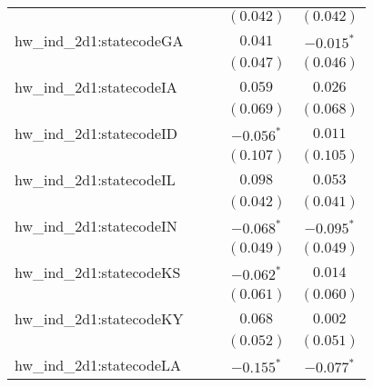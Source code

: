 \begin{center}
\begin{longtable}{l c c c c}
                         &                       &                       & $(0.042)$             & $(0.042)$             \\
hw\_ind\_2d1:statecodeGA &                       &                       & $0.041$               & $\mathbf{-0.015}^{*}$ \\
                         &                       &                       & $(0.047)$             & $(0.046)$             \\
hw\_ind\_2d1:statecodeIA &                       &                       & $0.059$               & $0.026$               \\
                         &                       &                       & $(0.069)$             & $(0.068)$             \\
hw\_ind\_2d1:statecodeID &                       &                       & $\mathbf{-0.056}^{*}$ & $0.011$               \\
                         &                       &                       & $(0.107)$             & $(0.105)$             \\
hw\_ind\_2d1:statecodeIL &                       &                       & $0.098$               & $0.053$               \\
                         &                       &                       & $(0.042)$             & $(0.041)$             \\
hw\_ind\_2d1:statecodeIN &                       &                       & $\mathbf{-0.068}^{*}$ & $\mathbf{-0.095}^{*}$ \\
                         &                       &                       & $(0.049)$             & $(0.049)$             \\
hw\_ind\_2d1:statecodeKS &                       &                       & $\mathbf{-0.062}^{*}$ & $0.014$               \\
                         &                       &                       & $(0.061)$             & $(0.060)$             \\
hw\_ind\_2d1:statecodeKY &                       &                       & $0.068$               & $0.002$               \\
                         &                       &                       & $(0.052)$             & $(0.051)$             \\
hw\_ind\_2d1:statecodeLA &                       &                       & $\mathbf{-0.155}^{*}$ & $\mathbf{-0.077}^{*}$ \\

\end{longtable}
\end{center}

